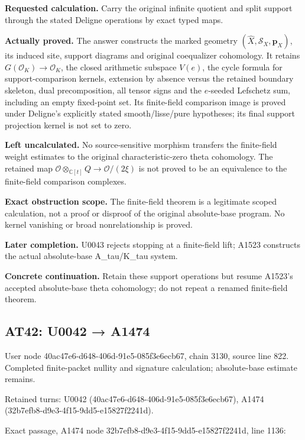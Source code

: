 \textbf{Requested calculation.} Carry the original infinite quotient and
split support through the stated Deligne operations by exact typed maps.

\textbf{Actually proved.} The answer constructs the marked geometry
\((\widehat X,\mathcal S_X,\mathbf p_X)\), its induced site, support
diagrams and original coequalizer cohomology. It retains
\(G(\mathcal O_K)\to\mathcal O_K\), the closed arithmetic subspace
\(V(e)\), the cycle formula for support-comparison kernels, extension by
absence versus the retained boundary skeleton, dual precomposition, all
tensor signs and the \(e\)-seeded Lefschetz sum, including an empty
fixed-point set. Its finite-field comparison image is proved under
Deligne's explicitly stated smooth/lisse/pure hypotheses; its final
support projection kernel is not set to zero.

\textbf{Left uncalculated.} No source-sensitive morphism transfers the
finite-field weight estimates to the original characteristic-zero theta
cohomology. The retained map
\(\mathcal O\otimes_{\mathbb C[t]}Q\to\mathcal O/(2\xi)\) is not proved
to be an equivalence to the finite-field comparison complexes.

\textbf{Exact obstruction scope.} The finite-field theorem is a
legitimate scoped calculation, not a proof or disproof of the original
absolute-base program. No kernel vanishing or broad nonrelationship is
proved.

\textbf{Later completion.} U0043 rejects stopping at a finite-field
lift; A1523 constructs the actual absolute-base A\_tau/K\_tau system.

\textbf{Concrete continuation.} Retain these support operations but
resume A1523's accepted absolute-base theta cohomology; do not repeat a
renamed finite-field theorem.

\subsection{AT42: U0042 → A1474}\label{at42-u0042-a1474}

User node 40ac47e6-d648-406d-91e5-085f3e6ecb67, chain 3130, source line
822. Completed finite-packet nullity and signature calculation;
absolute-base estimate remains.

Retained turns: U0042 (40ac47e6-d648-406d-91e5-085f3e6ecb67), A1474
(32b7efb8-d9e3-4f15-9dd5-e15827f2241d).

Exact passage, A1474 node 32b7efb8-d9e3-4f15-9dd5-e15827f2241d, line
1136:

